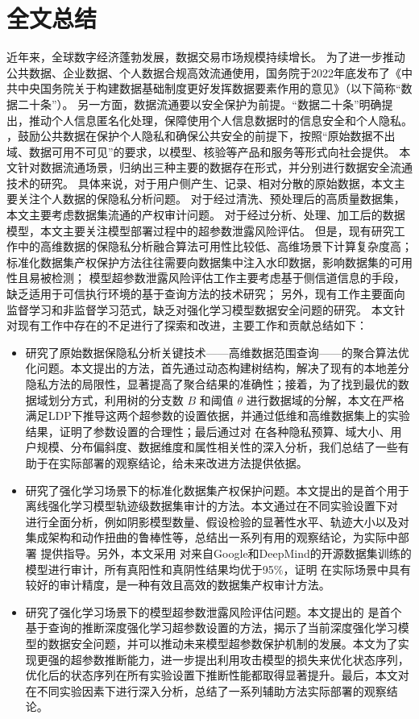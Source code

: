 \section{全文总结}
近年来，全球数字经济蓬勃发展，数据交易市场规模持续增长。
为了进一步推动公共数据、企业数据、个人数据合规高效流通使用，国务院于2022年底发布了《中共中央国务院关于构建数据基础制度更好发挥数据要素作用的意见》（以下简称“数据二十条”）。
另一方面，数据流通要以安全保护为前提。“数据二十条”明确提出，推动个人信息匿名化处理，保障使用个人信息数据时的信息安全和个人隐私。
，鼓励公共数据在保护个人隐私和确保公共安全的前提下，按照“原始数据不出域、数据可用不可见”的要求，以模型、核验等产品和服务等形式向社会提供。
本文针对数据流通场景，归纳出三种主要的数据存在形式，并分别进行数据安全流通技术的研究。
具体来说，对于用户侧产生、记录、相对分散的原始数据，本文主要关注个人数据的保隐私分析问题。
对于经过清洗、预处理后的高质量数据集，本文主要考虑数据集流通的产权审计问题。
对于经过分析、处理、加工后的数据模型，本文主要关注模型部署过程中的超参数泄露风险评估。
但是，现有研究工作中的高维数据的保隐私分析融合算法可用性比较低、高维场景下计算复杂度高；
标准化数据集产权保护方法往往需要向数据集中注入水印数据，影响数据集的可用性且易被检测；
模型超参数泄露风险评估工作主要考虑基于侧信道信息的手段，缺乏适用于可信执行环境的基于查询方法的技术研究；
另外，现有工作主要面向监督学习和非监督学习范式，缺乏对强化学习模型数据安全问题的研究。
本文针对现有工作中存在的不足进行了探索和改进，主要工作和贡献总结如下：
\begin{itemize}
    \item 研究了原始数据保隐私分析关键技术——高维数据范围查询——的聚合算法优化问题。本文提出的\myahead 方法，首先通过动态构建树结构，解决了现有的本地差分隐私方法的局限性，显著提高了聚合结果的准确性；接着，为了找到最优的数据域划分方式，\myahead 利用树的分支数 $B$ 和阈值 $\theta$ 进行数据域的分解，本文在严格满足LDP下推导这两个超参数的设置依据，并通过低维和高维数据集上的实验结果，证明了参数设置的合理性；最后通过对 \myahead 在各种隐私预算、域大小、用户规模、分布偏斜度、数据维度和属性相关性的深入分析，我们总结了一些有助于\myahead 在实际部署的观察结论，给未来改进方法提供依据。
    \item 研究了强化学习场景下的标准化数据集产权保护问题。本文提出的\sysnameo 是首个用于离线强化学习模型轨迹级数据集审计的方法。本文通过在不同实验设置下对 \sysnameo 进行全面分析，例如阴影模型数量、假设检验的显著性水平、轨迹大小以及对集成架构和动作扭曲的鲁棒性等，总结出一系列有用的观察结论，为实际中部署 \sysnameo 提供指导。另外，本文采用 \sysnameo 对来自Google和DeepMind的开源数据集训练的模型进行审计，所有真阳性和真阴性结果均优于95\%，证明 \sysnameo 在实际场景中具有较好的审计精度，是一种有效且高效的数据集产权审计方法。
    \item 研究了强化学习场景下的模型超参数泄露风险评估问题。本文提出的 \sysname 是首个基于查询的推断深度强化学习超参数设置的方法，揭示了当前深度强化学习模型的数据安全问题，并可以推动未来模型超参数保护机制的发展。本文为了实现更强的超参数推断能力，进一步提出利用攻击模型的损失来优化状态序列，优化后的状态序列在所有实验设置下推断性能都取得显著提升。最后，本文对\sysname 在不同实验因素下进行深入分析，总结了一系列辅助方法实际部署的观察结论。
\end{itemize}


